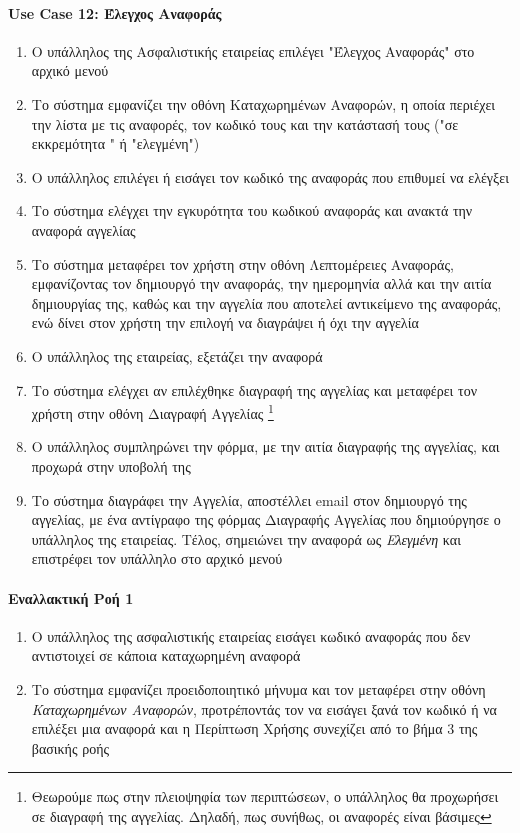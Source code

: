\documentclass{../ol-softwaremanual}
\begin{document}
	\paragraph{\en Use Case 12: \gr Έλεγχος Αναφοράς}  
	\begin{enumerate}
		\item Ο υπάλληλος της Ασφαλιστικής εταιρείας επιλέγει \en"\gr Έλεγχος Αναφοράς\en" \gr στο αρχικό μενού
		\item Το σύστημα εμφανίζει την οθόνη Καταχωρημένων Αναφορών, η οποία περιέχει την λίστα με τις αναφορές, τον κωδικό τους και την κατάστασή τους (\en"\gr σε εκκρεμότητα \en" \gr ή \en"\gr ελεγμένη\en"\gr)
		\item Ο υπάλληλος επιλέγει ή εισάγει τον κωδικό της αναφοράς που επιθυμεί να ελέγξει 
		\item Το σύστημα ελέγχει την εγκυρότητα του κωδικού αναφοράς και ανακτά την αναφορά αγγελίας
		\item Το σύστημα μεταφέρει τον χρήστη στην οθόνη Λεπτομέρειες Αναφοράς, εμφανίζοντας τον δημιουργό την αναφοράς, την ημερομηνία αλλά και την αιτία δημιουργίας της, καθώς και την αγγελία που αποτελεί αντικείμενο της αναφοράς, ενώ δίνει στον χρήστη την επιλογή να διαγράψει ή όχι την αγγελία
		\item Ο υπάλληλος της εταιρείας, εξετάζει την αναφορά 
		\item Το σύστημα ελέγχει αν επιλέχθηκε διαγραφή της αγγελίας και μεταφέρει τον χρήστη στην οθόνη Διαγραφή Αγγελίας \footnote[2]{Θεωρούμε πως στην πλειοψηφία των περιπτώσεων, ο υπάλληλος θα προχωρήσει σε διαγραφή της αγγελίας. Δηλαδή, πως συνήθως, οι αναφορές είναι βάσιμες}
		\item Ο υπάλληλος συμπληρώνει την φόρμα, με την αιτία διαγραφής της αγγελίας, και προχωρά στην υποβολή της
		\item Το σύστημα διαγράφει την Αγγελία, αποστέλλει \en email \gr στον δημιουργό της αγγελίας, με ένα αντίγραφο της φόρμας Διαγραφής Αγγελίας που δημιούργησε ο υπάλληλος της εταιρείας. Τέλος, σημειώνει την αναφορά ως \textit{Ελεγμένη} και επιστρέφει τον υπάλληλο στο αρχικό μενού
	\end{enumerate}
	
	\paragraph{Εναλλακτική Ροή 1}
	\begin{enumerate}
		\item Ο υπάλληλος της ασφαλιστικής εταιρείας εισάγει κωδικό αναφοράς που δεν αντιστοιχεί σε κάποια καταχωρημένη αναφορά
		\item Το σύστημα εμφανίζει προειδοποιητικό μήνυμα και τον μεταφέρει στην οθόνη \textit{Καταχωρημένων Αναφορών}, προτρέποντάς τον να εισάγει ξανά τον κωδικό ή να επιλέξει μια αναφορά και η Περίπτωση Χρήσης συνεχίζει από το βήμα 3 της βασικής ροής
	\end{enumerate}	
	
\end{document}
